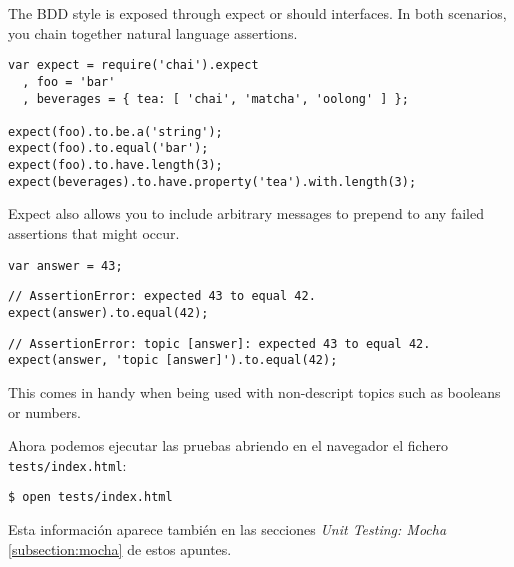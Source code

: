 The BDD style is exposed through expect or should interfaces. In both scenarios, you chain together natural language assertions.

\begin{verbatim}
var expect = require('chai').expect
  , foo = 'bar'
  , beverages = { tea: [ 'chai', 'matcha', 'oolong' ] };

expect(foo).to.be.a('string');
expect(foo).to.equal('bar');
expect(foo).to.have.length(3);
expect(beverages).to.have.property('tea').with.length(3);
\end{verbatim}
Expect also allows you to include arbitrary messages to prepend to any failed assertions that might occur.

\begin{verbatim}
var answer = 43;
\end{verbatim}

\begin{verbatim}
// AssertionError: expected 43 to equal 42.
expect(answer).to.equal(42); 
\end{verbatim}

\begin{verbatim}
// AssertionError: topic [answer]: expected 43 to equal 42.
expect(answer, 'topic [answer]').to.equal(42);
\end{verbatim}
This comes in handy when being used with non-descript topics such as booleans or numbers.

Ahora podemos ejecutar las pruebas abriendo en el navegador el
fichero \verb|tests/index.html|:
\begin{verbatim}
$ open tests/index.html 
\end{verbatim}

Esta información aparece también en las secciones {\it Unit Testing: Mocha}
\ref{subsection:mocha} de
estos apuntes.


